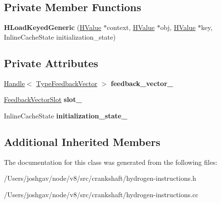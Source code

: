 \subsection*{Private Member Functions}
\begin{DoxyCompactItemize}
\item 
{\bfseries H\+Load\+Keyed\+Generic} (\hyperlink{classv8_1_1internal_1_1_h_value}{H\+Value} $\ast$context, \hyperlink{classv8_1_1internal_1_1_h_value}{H\+Value} $\ast$obj, \hyperlink{classv8_1_1internal_1_1_h_value}{H\+Value} $\ast$key, Inline\+Cache\+State initialization\+\_\+state)\hypertarget{classv8_1_1internal_1_1_h_load_keyed_generic_a777b246f52c5e388c727f3365fbcc449}{}\label{classv8_1_1internal_1_1_h_load_keyed_generic_a777b246f52c5e388c727f3365fbcc449}

\end{DoxyCompactItemize}
\subsection*{Private Attributes}
\begin{DoxyCompactItemize}
\item 
\hyperlink{classv8_1_1internal_1_1_handle}{Handle}$<$ \hyperlink{classv8_1_1internal_1_1_type_feedback_vector}{Type\+Feedback\+Vector} $>$ {\bfseries feedback\+\_\+vector\+\_\+}\hypertarget{classv8_1_1internal_1_1_h_load_keyed_generic_a54e47651229e4ad513c44856a98b8188}{}\label{classv8_1_1internal_1_1_h_load_keyed_generic_a54e47651229e4ad513c44856a98b8188}

\item 
\hyperlink{classv8_1_1internal_1_1_feedback_vector_slot}{Feedback\+Vector\+Slot} {\bfseries slot\+\_\+}\hypertarget{classv8_1_1internal_1_1_h_load_keyed_generic_a9b862020b11a080b0799a8e1e9a0b16e}{}\label{classv8_1_1internal_1_1_h_load_keyed_generic_a9b862020b11a080b0799a8e1e9a0b16e}

\item 
Inline\+Cache\+State {\bfseries initialization\+\_\+state\+\_\+}\hypertarget{classv8_1_1internal_1_1_h_load_keyed_generic_a31cde0f7104d795145ee9fae49eb7a8d}{}\label{classv8_1_1internal_1_1_h_load_keyed_generic_a31cde0f7104d795145ee9fae49eb7a8d}

\end{DoxyCompactItemize}
\subsection*{Additional Inherited Members}


The documentation for this class was generated from the following files\+:\begin{DoxyCompactItemize}
\item 
/\+Users/joshgav/node/v8/src/crankshaft/hydrogen-\/instructions.\+h\item 
/\+Users/joshgav/node/v8/src/crankshaft/hydrogen-\/instructions.\+cc\end{DoxyCompactItemize}
